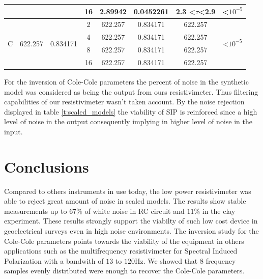 \documentclass{vie16}
\begin{document}
\begin{table}[H]
\begin{tabular}{@{}|c|c|c|c|c|c|c|c|@{}}
                   &                          &                            & 16                                 & 2.89942         & 0.0452261         & 2.3 \textless$\tau$\textless 2.9  & \textless $10^{-5}$                  \\ \hline
\multirow{4}{*}{C} & \multirow{4}{*}{622.257} & \multirow{4}{*}{0.834171}  & 2                                  & 622.257         & 0.834171          & 622.257                           & \multirow{4}{*}{\textless $10^{-5}$} \\
                   &                          &                            & 4                                  & 622.257         & 0.834171          & 622.257                           &                                      \\
                   &                          &                            & 8                                  & 622.257         & 0.834171          & 622.257                           &                                      \\
                   &                          &                            & 16                                 & 622.257         & 0.834171          & 622.257                           &                                   \\  \hline
\end{tabular}
\end{table}

For the inversion of Cole-Cole parameters the percent of noise in the synthetic model was considered as being the output from ours resistivimeter. Thus filtering capabilities of our resistivimeter wasn't taken account. By the noise rejection displayed in table \ref{t:scaled_models} the viability of SIP is reinforced since a high level of noise in the output consequently implying in higher level of noise in the input. 

\section{Conclusions}

Compared to others instruments in use today, the low power
resistivimeter was able to reject great amount of noise in scaled
models. The results show stable measurements up to $67\%$ of white
noise in RC circuit and $11 \%$ in the clay experiment. These results
strongly support the viabilty of such low cost device in geoelectrical
surveys even in high noise environments. The inversion study for the
Cole-Cole parameters points towards the viability of the equipment in
others applications such as the multifrequency resistivimeter for
Spectral Induced Polarization with a bandwith of $13$ to $120$Hz. We
showed that $8$ frequency samples evenly distributed were enough to
recover the Cole-Cole parameters.
\end{document}
